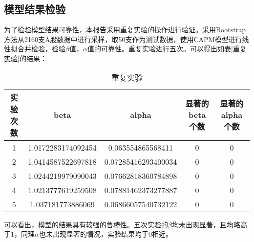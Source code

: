 \documentclass{xjtureport}
\begin{document}
\subsection{模型结果检验}
为了检验模型结果可靠性，本报告采用重复实验的操作进行验证。采用Bootstrap方法从2160支A股数据中进行采样，取50支作为测试数据，使用CAPM模型进行线性拟合并检验，检验$\beta$值，$\alpha$值的可靠性。重复实验进行五次。可以得出如表\ref{重复实验}的结果：
\begin{table}[H]
    \centering
    \caption{重复实验}
    \begin{tabular}{@{}ccccc@{}}
    \toprule
    \textbf{实验次数} & \textbf{beta}      & \textbf{alpha}      & \textbf{显著的beta个数} & \textbf{显著的alpha个数} \\ \midrule
    1             & 1.0172283174092454 & 0.063554865568411   & 0                  & 0                   \\
    2             & 1.0414587522697818 & 0.07285416293400034 & 0                  & 0                   \\
    3             & 1.0244219979090043 & 0.07662818360784898 & 0                  & 0                   \\
    4             & 1.0213777619259508 & 0.07881462373277887 & 0                  & 0                   \\
    5             & 1.037181773886069  & 0.06866057540732122 & 0                  & 0                   \\ \bottomrule
    \end{tabular}
    \end{table}
可以看出，模型的结果具有较强的鲁棒性。五次实验的$\beta$均未出现显著，且均略高于1，同理$\alpha$也未出现显著的情况，实验结果均于0相近。
\end{document}

